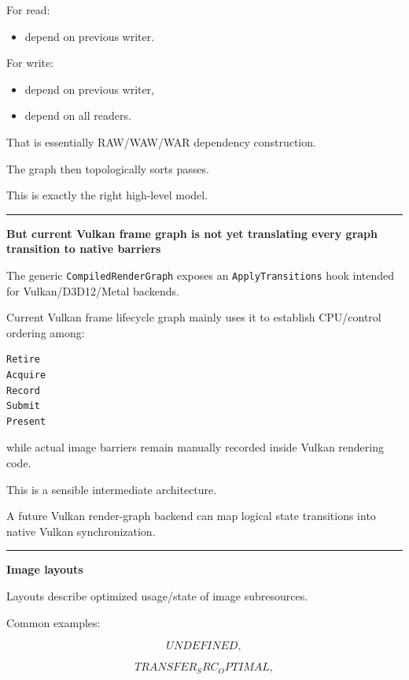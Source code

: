 For read:

\begin{itemize}
\tightlist
\item
  depend on previous writer.
\end{itemize}

For write:

\begin{itemize}
\tightlist
\item
  depend on previous writer,
\item
  depend on all readers.
\end{itemize}

That is essentially RAW/WAW/WAR dependency construction.

The graph then topologically sorts passes.

This is exactly the right high-level model.

\begin{center}\rule{0.5\linewidth}{0.5pt}\end{center}

\textbf{But current Vulkan frame graph is not yet translating every graph transition to native barriers}

The generic \texttt{CompiledRenderGraph} exposes an \texttt{ApplyTransitions} hook intended for Vulkan/D3D12/Metal backends.

Current Vulkan frame lifecycle graph mainly uses it to establish CPU/control ordering among:

\begin{verbatim}
Retire
Acquire
Record
Submit
Present
\end{verbatim}

while actual image barriers remain manually recorded inside Vulkan rendering code.

This is a sensible intermediate architecture.

A future Vulkan render-graph backend can map logical state transitions into native Vulkan synchronization.

\begin{center}\rule{0.5\linewidth}{0.5pt}\end{center}

\textbf{Image layouts}

Layouts describe optimized usage/state of image subresources.

Common examples:

\[
UNDEFINED,
\]

\[
TRANSFER_SRC_OPTIMAL,
\]

